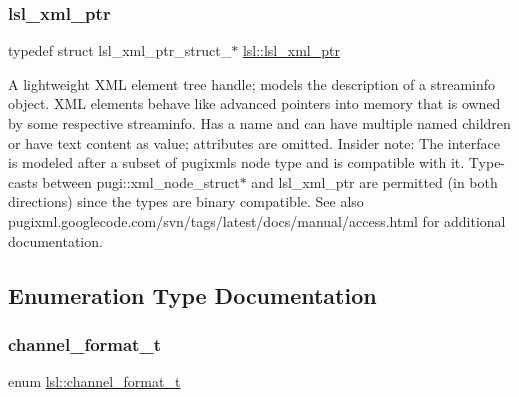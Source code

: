 \subsubsection{\texorpdfstring{lsl\+\_\+xml\+\_\+ptr}{lsl\_xml\_ptr}}
{\footnotesize\ttfamily typedef struct lsl\+\_\+xml\+\_\+ptr\+\_\+struct\+\_\+$\ast$ \hyperlink{namespacelsl_a5edc7a49a1a1be1634fe6dce3d59c59b}{lsl\+::lsl\+\_\+xml\+\_\+ptr}}

A lightweight X\+ML element tree handle; models the description of a streaminfo object. X\+ML elements behave like advanced pointers into memory that is owned by some respective streaminfo. Has a name and can have multiple named children or have text content as value; attributes are omitted. Insider note\+: The interface is modeled after a subset of pugixml\textquotesingle{}s node type and is compatible with it. Type-\/casts between pugi\+::xml\+\_\+node\+\_\+struct$\ast$ and lsl\+\_\+xml\+\_\+ptr are permitted (in both directions) since the types are binary compatible. See also pugixml.\+googlecode.\+com/svn/tags/latest/docs/manual/access.html for additional documentation. 

\subsection{Enumeration Type Documentation}
\mbox{\label{namespacelsl_a28d50dae6fd82eea8893ce3d63ccd46c}} 
\subsubsection{\texorpdfstring{channel\+\_\+format\+\_\+t}{channel\_format\_t}}
{\footnotesize\ttfamily enum \hyperlink{namespacelsl_a28d50dae6fd82eea8893ce3d63ccd46c}{lsl\+::channel\+\_\+format\+\_\+t}}

